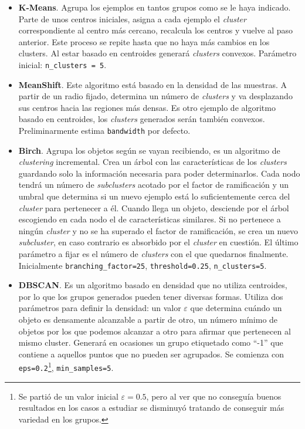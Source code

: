 \documentclass[a4paper, 20pt]{article}
\begin{document}
\begin{itemize}
\item \textbf{K-Means}. Agrupa los ejemplos en tantos grupos como se le haya indicado. Parte de unos centros iniciales, asigna a cada ejemplo el \textit{cluster} correspondiente al centro más cercano, recalcula los centros y vuelve al paso anterior. Este proceso se repite hasta que no haya más cambios en los clusters. Al estar basado en centroides generará \textit{clusters} convexos. Parámetro inicial: \texttt{n\_clusters = 5}.
\item \textbf{MeanShift}. Este algoritmo está basado en la densidad de las muestras. A partir de un radio fijado, determina un número de \textit{clusters} y va desplazando sus centros hacia las regiones más densas. Es otro ejemplo de algoritmo basado en centroides, los \textit{clusters} generados serán también convexos. Preliminarmente estima \texttt{bandwidth} por defecto.
\item \textbf{Birch}. Agrupa los objetos según se vayan recibiendo, es un algoritmo de \textit{clustering} incremental. Crea un árbol con las características de los \textit{clusters} guardando solo la información necesaria para poder determinarlos. Cada nodo tendrá un número de \textit{subclusters} acotado por el factor de ramificación y un umbral que determina si un nuevo ejemplo está lo suficientemente cerca del \textit{cluster} para pertenecer a él. Cuando llega un objeto, desciende por el árbol escogiendo en cada nodo el de características similares. Si no pertenece a ningún \textit{cluster} y no se ha superado el factor de ramificación, se crea un nuevo \textit{subcluster}, en caso contrario es absorbido por el \textit{cluster} en cuestión. El último parámetro a fijar es el número de \textit{clusters} con el que quedarnos finalmente. Inicialmente  \texttt{branching\_factor=25}, \texttt{threshold=0.25}, \texttt{n\_clusters=5}.
\item \textbf{DBSCAN}. Es un algoritmo basado en densidad que no utiliza centroides, por lo que los grupos generados pueden tener diversas formas. Utiliza dos parámetros para definir la densidad: un valor $\varepsilon$ que determina cuándo un objeto es densamente alcanzable a partir de otro, un número mínimo de objetos por los que podemos alcanzar a otro para afirmar que pertenecen al mismo cluster. Generará en ocasiones un grupo etiquetado como ``-1'' que contiene a aquellos puntos que no pueden ser agrupados. Se comienza con \texttt{eps=0.2}\footnote{Se partió de un valor inicial $\varepsilon = 0.5$,  pero al ver que no conseguía buenos resultados en los casos a estudiar se disminuyó tratando de conseguir más variedad en los grupos.}, \texttt{min\_samples=5}.

\end{itemize}
\end{document}
